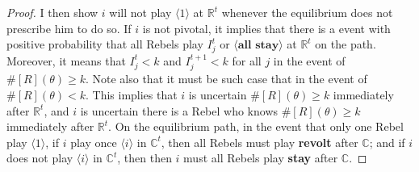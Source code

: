 \documentclass[12pt,letter]{article}
\newcommand{\Kappa}{\mathbb{C}}
\newcommand{\Omicron}{\mathbb{R}}
\theoremstyle{definition}
\theoremstyle{definition}
\theoremstyle{remark}
\theoremstyle{claim}
\begin{document}
\begin{proof}
I then show $i$ will not play $\langle 1 \rangle$ at $\Omicron^t$ whenever the equilibrium does not prescribe him to do so. If $i$ is not pivotal, it implies that there is a event with positive probability that all Rebels play $I^t_j$ or $\langle \textbf{all stay} \rangle$ at $\Omicron^t$ on the path. Moreover, it means that $I^t_j<k$ and $I^{t+1}_j<k$ for all $j$ in the event of $\#[R](\theta)\geq k$. Note also that it must be such case that in the event of $\#[R](\theta)<k$. This implies that $i$ is uncertain $\#[R](\theta)\geq k$ immediately after $\Omicron^t$, and $i$ is uncertain there is a Rebel who knows $\#[R](\theta)\geq k$ immediately after $\Omicron^t$. On the equilibrium path, in the event that only one Rebel play $\langle 1 \rangle$, if $i$ play once $\langle i \rangle$ in $\Kappa^t$, then all Rebels must play \textbf{revolt} after $\Kappa$; and if $i$ does not play $\langle i \rangle$ in $\Kappa^t$, then then $i$ must all Rebels play \textbf{stay} after $\Kappa$.


%


\end{proof}
\end{document}
